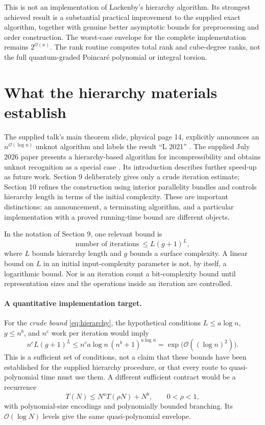\documentclass[11pt]{article}
\theoremstyle{remark}\newtheorem{remark}[theorem]{Remark}
\newcommand{\OO}{\mathcal O}
\begin{document}
This is not an implementation of Lackenby's hierarchy algorithm. Its strongest
achieved result is a substantial practical improvement to the supplied exact
algorithm, together with genuine better asymptotic bounds for preprocessing
and order construction. The worst-case envelope for the complete implementation
remains $2^{\OO(n)}$. The rank routine computes total rank and cube-degree
ranks, not the full quantum-graded Poincar\'e polynomial or integral torsion.

\section{What the hierarchy materials establish}
\label{sec:lackenby}

The supplied talk's main theorem slide, physical page 14, explicitly announces
an $n^{\OO(\log n)}$ unknot algorithm and labels the result ``L 2021''
\cite{lackenby-talk}. The supplied July 2026 paper presents a hierarchy-based
algorithm for incompressibility and obtains unknot recognition as a special
case \cite{lackenby-paper}. Its introduction describes further speed-up as
future work. Section 9 deliberately gives only a crude iteration estimate;
Section 10 refines the construction using interior parallelity bundles and
controls hierarchy length in terms of the initial complexity. These are
important distinctions: an announcement, a terminating algorithm, and a
particular implementation with a proved running-time bound are different
objects.

In the notation of Section 9, one relevant bound is
\begin{equation}\label{eq:hierarchy}
  \text{number of iterations}\ \leq L(g+1)^L,
\end{equation}
where $L$ bounds hierarchy length and $g$ bounds a surface complexity.
A linear bound on $L$ in an initial input-complexity parameter is not, by
itself, a logarithmic bound. Nor is an iteration count a bit-complexity
bound until representation sizes and the operations inside an iteration
are controlled.

\paragraph{A quantitative implementation target.}
For the \emph{crude bound} \eqref{eq:hierarchy}, the hypothetical conditions
$L\leq a\log n$, $g\leq n^b$, and $n^c$ work per iteration would imply
\[
  n^c L(g+1)^L
  \leq n^c a\log n\,(n^b+1)^{a\log n}
  =\exp\bigl(\OO((\log n)^2)\bigr).
\]
This is a sufficient set of conditions, not a claim that these bounds have
been established for the supplied hierarchy procedure, or that every route
to quasi-polynomial time must use them. A different sufficient contract would
be a recurrence
\[
 T(N)\leq N^a T(\rho N)+N^b,\qquad 0<\rho<1,
\]
with polynomial-size encodings and polynomially bounded branching. Its
$\OO(\log N)$ levels give the same quasi-polynomial envelope.
\end{document}
